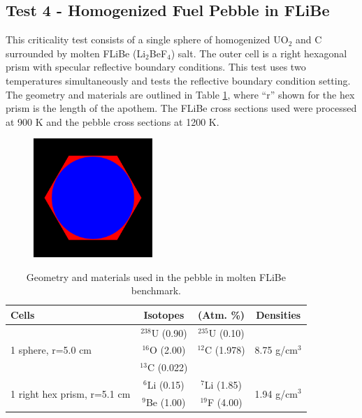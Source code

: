 \documentclass[preprint,12pt]{elsarticle}
\begin{document}
\newpage
\subsection{Test 4 - Homogenized Fuel Pebble in FLiBe}

This criticality test consists of a single sphere of homogenized UO$_2$ and C surrounded by molten FLiBe (Li$_2$BeF$_4$) salt.  The outer cell is a right hexagonal prism with specular reflective boundary conditions.  This test uses two temperatures simultaneously and tests the reflective boundary condition setting.  The geometry and materials are outlined in Table \ref{pebble_geom}, where ``r'' shown for the hex prism is the length of the apothem.  The FLiBe cross sections used were processed at 900 K and the pebble cross sections at 1200 K.

\begin{figure}[h!] 
  \centering
    \includegraphics[width=0.4\textwidth]{graphics/flibe-xy.png}
     \caption{  \label{flibe_geom_pic} }
\end{figure}

\begin{table}[h]
\centering
\caption{Geometry and materials used in the pebble in molten FLiBe benchmark.}
\label{pebble_geom}
\begin{tabular}{| l | c  c | c |}
\hline
Cells & Isotopes & (Atm.  \%)& Densities \\
\hline
\multirow{3}{*}{1 sphere, r=5.0 cm }  &   $^{238}$U   (0.90) &  $^{235}$U   (0.10) &  \multirow{3}{*}{8.75 g/cm$^3$} \\
                                      &   $^{16}$O    (2.00) &  $^{12}$C    (1.978) &  \\
                                      &   $^{13}$C    (0.022)&                     &  \\
\hline
\multirow{2}{*}{1 right hex prism, r=5.1 cm }  &   $^{6}$Li  (0.15) &  $^{7}$Li  (1.85)&  \multirow{2}{*}{1.94 g/cm$^3$} \\
                                               &  $^{9}$Be  (1.00) & $^{19}$F  (4.00) &  \\
\hline
\end{tabular}
\end{table}
\end{document}
